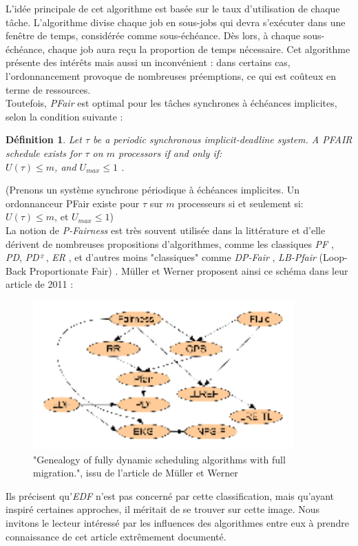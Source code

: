 \documentclass[11pt,a4paper,oneside]{report}
\newtheorem{mydef}{Définition}
\begin{document}
L'idée principale de cet algorithme est basée sur le taux d'utilisation de chaque tâche. 
L'algorithme divise chaque job en sous-jobs qui devra s'exécuter dans une fenêtre de temps, 
considérée comme sous-échéance. Dès lors, à chaque sous-échéance, 
chaque job aura reçu la proportion de temps nécessaire. 
Cet algorithme présente des intérêts mais aussi un inconvénient : dans certains cas, 
l'ordonnancement provoque de nombreuses préemptions, ce qui est coûteux en terme de ressources.\\

Toutefois, \textit{PFair} est optimal pour les tâches synchrones à échéances implicites, selon 
la condition suivante :\\
\begin{mydef}
	Let $\tau$ be a periodic synchronous implicit-deadline system.
	A PFAIR schedule exists for $\tau$ on $m$ processors if and only if:\\
	$U(\tau) \leq m$, and $U_{max} \leq 1$ \cite{baruah_proportionate_1996}.
\end{mydef}
(Prenons un système synchrone périodique à échéances implicites. 
Un ordonnanceur PFair existe pour $\tau$ sur $m$ processeurs si et seulement si:\\
$U(\tau) \leq m$, et $U_{max} \leq 1$)\\

La notion de \textit{P-Fairness} est très souvent utilisée dans la littérature et d'elle dérivent 
de nombreuses propositions d'algorithmes, comme les classiques \textit{PF} \cite{baruah_proportionate_1996}, \textit{PD}, \textit{PD²} , \textit{ER} \cite{anderson_early-release_2000}, 
et d'autres moins "classiques" comme \textit{DP-Fair} \cite{levin_dp-fair:_2010}, 
\textit{LB-Pfair} (Loop-Back Proportionate Fair) \cite{kramer_proportionate_2015}. 
Müller et Werner proposent ainsi ce schéma dans leur article de 2011 :\\
\begin{figure}[ht]
	\caption{"Genealogy of fully dynamic scheduling algorithms with full migration.", issu de l'article de Müller et Werner\cite{muller_genealogy_2011}}
	\includegraphics[width=10cm]{img/genealogy_pf}
\end{figure}
Ils précisent qu'\textit{EDF} n'est pas concerné par cette classification, mais qu'ayant 
inspiré certaines approches, il méritait de se trouver sur cette image. 
Nous invitons le lecteur intéressé par les influences des algorithmes entre eux 
à prendre connaissance de cet article extrêmement documenté.\\
\end{document}
